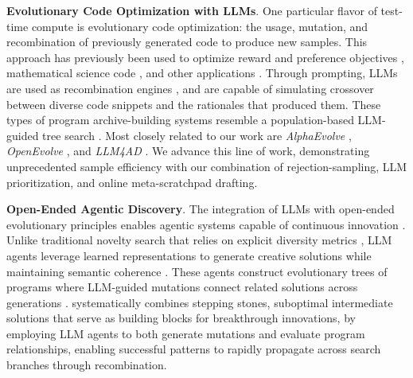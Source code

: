\textbf{Evolutionary Code Optimization with LLMs}. One particular flavor of test-time compute is evolutionary code optimization: the usage, mutation, and recombination of previously generated code to produce new samples. This approach has previously been used to optimize reward and preference objectives \citep{lu2024discovering, ma2023eureka}, mathematical science code \citep{romera2024mathematical}, and other applications \citep{lehman2022evolutionlargemodels, lange2024large, meyerson2023language, berman2025record, lange2025ai}. Through prompting, LLMs are used as recombination engines \citep{lange2023discovering_es, meyerson2023language}, and are capable of simulating crossover between diverse code snippets and the rationales that produced them. These types of program archive-building systems resemble a population-based LLM-guided tree search \citep{jiang2025aide, inoue2025wider}. Most closely related to our work are \textit{AlphaEvolve} \citep{novikov2025alphaevolve}, \textit{OpenEvolve} \citep{openevolve}, and \textit{LLM4AD} \citep{liu2024llm4ad}. We advance this line of work, demonstrating unprecedented sample efficiency with our combination of rejection-sampling, LLM prioritization, and online meta-scratchpad drafting.


\textbf{Open-Ended Agentic Discovery}. The integration of LLMs with open-ended evolutionary principles enables agentic systems capable of continuous innovation \citep{stanley2017open, zhang2025darwin}. Unlike traditional novelty search that relies on explicit diversity metrics \citep{lehman2008exploiting, lehman2011abandoning}, LLM agents leverage learned representations to generate creative solutions while maintaining semantic coherence \citep{omniepic, hu2024automated, novikov2025alphaevolve}. These agents construct evolutionary trees of programs where LLM-guided mutations connect related solutions across generations \citep{lehman2020surprising}. \ouralgo systematically combines stepping stones, suboptimal intermediate solutions that serve as building blocks for breakthrough innovations, by employing LLM agents to both generate mutations and evaluate program relationships, enabling successful patterns to rapidly propagate across search branches through recombination.